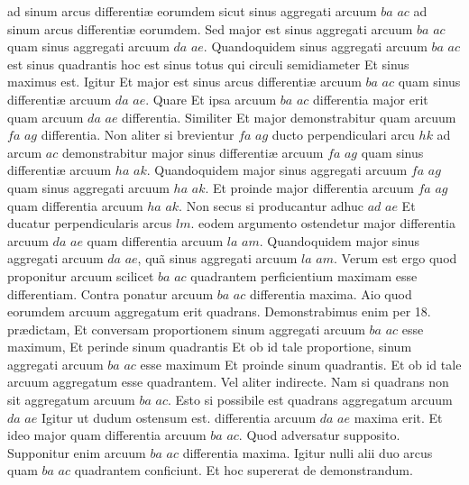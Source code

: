 \documentclass[11pt,a4paper]{article}
\begin{document}
ad sinum arcus differentiæ eorumdem sicut sinus aggregati arcuum $ba$ $ac$ ad sinum arcus differentiæ eorumdem. Sed major est sinus aggregati arcuum $ba$ $ac$ quam sinus aggregati arcuum $da$ $ae$. Quandoquidem sinus aggregati arcuum $ba$ $ac$ est sinus quadrantis hoc est sinus totus qui circuli semidiameter Et sinus maximus est. Igitur Et major est sinus arcus differentiæ arcuum $ba$ $ac$ quam sinus differentiæ arcuum $da$ $ae$. Quare Et ipsa arcuum $ba$ $ac$ differentia major erit quam arcuum $da$ $ae$ differentia. Similiter Et major demonstrabitur quam arcuum $fa$ $ag$ differentia. Non aliter si brevientur $fa$ $ag$ ducto perpendiculari arcu $hk$ ad arcum $ac$ demonstrabitur major sinus differentiæ arcuum $fa$ $ag$ quam sinus differentiæ arcuum $ha$ $ak$. Quandoquidem major sinus aggregati arcuum $fa$ $ag$ quam sinus aggregati arcuum $ha$ $ak$.  Et proinde major differentia arcuum $fa$ $ag$ quam differentia arcuum $ha$ $ak$. Non secus si producantur adhuc $ad$ $ae$ Et ducatur perpendicularis arcus $lm$. eodem argumento ostendetur major differentia arcuum $da$ $ae$ quam differentia arcuum $la$ $am$. Quandoquidem major sinus aggregati arcuum $da$ $ae$, quã sinus aggregati arcuum $la$ $am$. Verum est ergo quod proponitur arcuum scilicet $ba$ $ac$ quadrantem perficientium maximam esse differentiam. Contra ponatur arcuum $ba$ $ac$ differentia maxima. Aio quod eorumdem arcuum aggregatum erit quadrans. Demonstrabimus enim per 18. prædictam, Et conversam proportionem sinum aggregati arcuum $ba$ $ac$ esse maximum, Et perinde sinum quadrantis Et ob id tale proportione, sinum aggregati arcuum $ba$ $ac$ esse maximum Et proinde sinum quadrantis. Et ob id tale arcuum aggregatum esse quadrantem. Vel aliter indirecte. Nam si quadrans non sit aggregatum arcuum $ba$ $ac$. Esto si possibile est quadrans aggregatum arcuum $da$ $ae$ Igitur ut dudum ostensum est. differentia arcuum $da$ $ae$ maxima erit. Et ideo major quam differentia arcuum $ba$ $ac$. Quod adversatur supposito. Supponitur enim arcuum $ba$ $ac$ differentia maxima. Igitur nulli alii duo arcus quam $ba$ $ac$ quadrantem conficiunt. Et hoc supererat de  demonstrandum.

\end{document}
